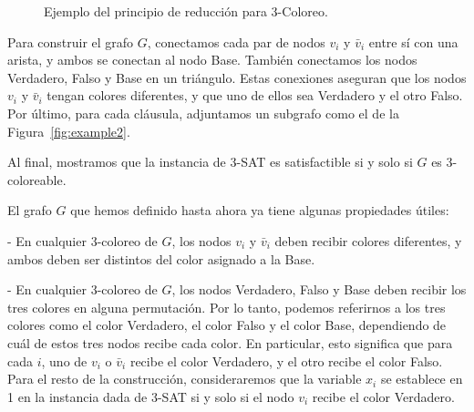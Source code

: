 \documentclass[12pt]{article}
\begin{document}
\begin{figure}[h!]
    \centering
    \caption{Ejemplo del principio de reducción para 3-Coloreo.}
    \label{fig:example1}
\end{figure}


Para construir el grafo $G$, conectamos cada par de nodos $v_i$ y $\bar{v}_i$ entre sí con una arista, y ambos se conectan al nodo Base. También conectamos los nodos Verdadero, Falso y Base en un triángulo. Estas conexiones aseguran que los nodos $v_i$ y $\bar{v}_i$ tengan colores diferentes, y que uno de ellos sea Verdadero y el otro Falso. Por último, para cada cláusula, adjuntamos un subgrafo como el de la Figura~\ref{fig:example2}.

Al final, mostramos que la instancia de 3-SAT es satisfactible si y solo si $G$ es 3-coloreable.

El grafo \( G \) que hemos definido hasta ahora ya tiene algunas propiedades útiles:

- En cualquier 3-coloreo de \( G \), los nodos \( v_i \) y \( \bar{v}_i \) deben recibir colores diferentes, y ambos deben ser distintos del color asignado a la Base.

- En cualquier 3-coloreo de \( G \), los nodos Verdadero, Falso y Base deben recibir los tres colores en alguna permutación. Por lo tanto, podemos referirnos a los tres colores como el color Verdadero, el color Falso y el color Base, dependiendo de cuál de estos tres nodos recibe cada color. En particular, esto significa que para cada \( i \), uno de \( v_i \) o \( \bar{v}_i \) recibe el color Verdadero, y el otro recibe el color Falso. Para el resto de la construcción, consideraremos que la variable \( x_i \) se establece en 1 en la instancia dada de 3-SAT si y solo si el nodo \( v_i \) recibe el color Verdadero.
\end{document}
